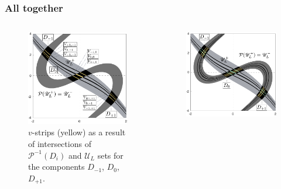 \documentclass [10pt] {beamer}
\begin{document}
\begin{frame}
	\frametitle{All together}
	\begin{columns}[T]
		\begin{column}{.5\textwidth}
			\begin{figure}
			\includegraphics[width = 1\textwidth]{pic/v-strips-last-step.pdf}
			\caption{$v$-strips (yellow) as a result of intersections of $\mathcal{P}^{-1}(D_i)$ and $\mathscr{U}_L$ sets for the components $D_{-1}$, $D_0$, $D_{+1}$.}
			\label{pic:v-strips-last-step}
			\end{figure}
		\end{column}
		\begin{column}{.5\textwidth}
			\begin{figure}
			\includegraphics[width = 1\textwidth]{pic/h-and-v-strips.pdf}

\end{figure}
\end{column}
\end{columns}
\end{frame}
\end{document}
